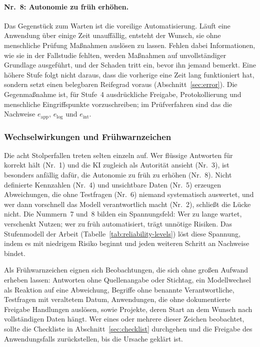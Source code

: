 \documentclass[a4paper,12pt]{article}
\theoremstyle{definition}
\begin{document}
\paragraph{Nr.~8: Autonomie zu früh erhöhen.}
Das Gegenstück zum Warten ist die voreilige Automatisierung. Läuft eine Anwendung über einige Zeit unauffällig, entsteht der Wunsch, sie ohne menschliche Prüfung Maßnahmen auslösen zu lassen. Fehlen dabei Informationen, wie sie in der Fallstudie fehlten, werden Maßnahmen auf unvollständiger Grundlage ausgeführt, und der Schaden tritt ein, bevor ihn jemand bemerkt. Eine höhere Stufe folgt nicht daraus, dass die vorherige eine Zeit lang funktioniert hat, sondern setzt einen belegbaren Reifegrad voraus (Abschnitt~\ref{sec:error}). Die Gegenmaßnahme ist, für Stufe~4 ausdrückliche Freigabe, Protokollierung und menschliche Eingriffspunkte vorzuschreiben; im Prüfverfahren sind das die Nachweise $e_{\mathrm{app}}$, $e_{\mathrm{log}}$ und $e_{\mathrm{int}}$.

\subsubsection{Wechselwirkungen und Frühwarnzeichen}
Die acht Stolperfallen treten selten einzeln auf. Wer flüssige Antworten für korrekt hält (Nr.~1) und die KI zugleich als Autorität ansieht (Nr.~3), ist besonders anfällig dafür, die Autonomie zu früh zu erhöhen (Nr.~8). Nicht definierte Kennzahlen (Nr.~4) und unsichtbare Daten (Nr.~5) erzeugen Abweichungen, die ohne Testfragen (Nr.~6) niemand systematisch auswertet, und wer dann vorschnell das Modell verantwortlich macht (Nr.~2), schließt die Lücke nicht. Die Nummern~7 und~8 bilden ein Spannungsfeld: Wer zu lange wartet, verschenkt Nutzen; wer zu früh automatisiert, trägt unnötige Risiken. Das Stufenmodell der Arbeit (Tabelle~\ref{tab:reliability-levels}) löst diese Spannung, indem es mit niedrigem Risiko beginnt und jeden weiteren Schritt an Nachweise bindet.

Als Frühwarnzeichen eignen sich Beobachtungen, die sich ohne großen Aufwand erheben lassen: Antworten ohne Quellenangabe oder Stichtag, ein Modellwechsel als Reaktion auf eine Abweichung, Begriffe ohne benannte Verantwortliche, Testfragen mit veraltetem Datum, Anwendungen, die ohne dokumentierte Freigabe Handlungen auslösen, sowie Projekte, deren Start an dem Wunsch nach vollständigen Daten hängt. Wer eines oder mehrere dieser Zeichen beobachtet, sollte die Checkliste in Abschnitt~\ref{sec:checklist} durchgehen und die Freigabe des Anwendungsfalls zurückstellen, bis die Ursache geklärt ist.
\end{document}
